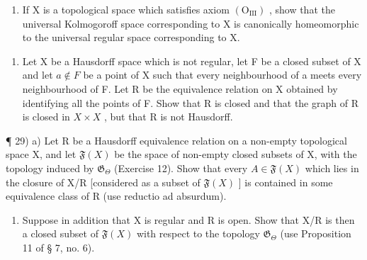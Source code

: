 \begin{enumerate}
\def\labelenumi{\alph{enumi})}
\setcounter{enumi}{3}
\tightlist
\item
  If X is a topological space which satisfies axiom \((\mathrm{O}_{\mathrm{III}})\) , show that the universal Kolmogoroff space corresponding to X is canonically homeomorphic to the universal regular space corresponding to X.
\end{enumerate}

\begin{enumerate}
\def\labelenumi{\arabic{enumi})}
\setcounter{enumi}{27}
\tightlist
\item
  Let X be a Hausdorff space which is not regular, let F be a closed subset of X and let \(a \notin F\) be a point of X such that every neighbourhood of a meets every neighbourhood of F. Let R be the equivalence relation on X obtained by identifying all the points of F. Show that R is closed and that the graph of R is closed in \(X \times X\) , but that R is not Hausdorff.
\end{enumerate}

¶ 29) a) Let R be a Hausdorff equivalence relation on a non-empty topological space X, and let \(\mathfrak{F}(X)\) be the space of non-empty closed subsets of X, with the topology induced by \(\mathfrak{G}_{\Theta}\) (Exercise 12). Show that every \(A \in \mathfrak{F}(X)\) which lies in the closure of X/R {[}considered as a subset of \(\mathfrak{F}(X)\) {]} is contained in some equivalence class of R (use reductio ad absurdum).

\begin{enumerate}
\def\labelenumi{\alph{enumi})}
\setcounter{enumi}{1}
\tightlist
\item
  Suppose in addition that X is regular and R is open. Show that X/R is then a closed subset of \(\mathfrak{F}(X)\) with respect to the topology \(\mathfrak{G}_{\Theta}\) (use Proposition 11 of § 7, no. 6).
\end{enumerate}

